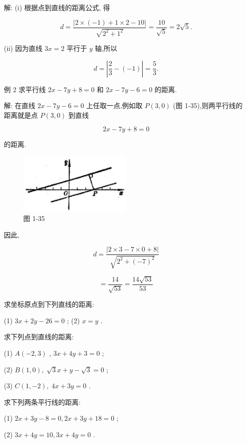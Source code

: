 \documentclass[lang=cn,newtx,10.5pt,scheme=chinese]{elegantbook}
\begin{document}
解: (i) 根据点到直线的距离公式, 得

\[
  d = \frac{\left| 2 \times \left( -1\right) + 1 \times 2 - {10}\right| }{\sqrt{{2}^{2} + {1}^{2}}} = \frac{10}{\sqrt{5}} = 2\sqrt{5}.
\]

(ii) 因为直线 \({3x} = 2\) 平行于 \(y\) 轴,所以

\[
  d = \left| {\frac{2}{3} - \left( {-1}\right) }\right| = \frac{5}{3}.
\]

例 2 求平行线 \({2x} - {7y} + 8 = 0\) 和 \({2x} - {7y} - 6 = 0\) 的距离.

解: 在直线 \({2x} - {7y} - 6 = 0\) 上任取一点,例如取 \(P\left( {3,0}\right)\) (图 1-35),则两平行线的距离就是点 \(P\left( {3,0}\right)\) 到直线

\[
    {2x} - {7y} + 8 = 0
\]

的距离.

\begin{figure}[h]
  \centering
  \includegraphics[max width=0.5\textwidth]{images/01912cc2-ffb6-728e-9ae7-b113ff05c64b_56_427717.jpg}
  \caption{图 1-35}
\end{figure}



因此,

\[
  d = \frac{\left| 2 \times 3 - 7 \times 0 + 8\right| }{\sqrt{{2}^{2} + {\left( -7\right) }^{2}}}
\]

\[
  = \frac{14}{\sqrt{53}} = \frac{{14}\sqrt{53}}{53}
\]

\begin{problemset}[练习]

\item 求坐标原点到下列直线的距离:

(1) \({3x} + {2y} - {26} = 0\) ; (2) \(x = y\) .

\item 求下列点到直线的距离:

(1) \(A\left( {-2,3}\right)\) , \({3x} + {4y} + 3 = 0\) ;

(2) \(B\left( {1,0}\right) ,\;\sqrt{3}x + y - \sqrt{3} = 0\) ;

(3) \(C\left( {1, - 2}\right) ,\;{4x} + {3y} = 0\) .

\item 求下列两条平行线的距离:

(1) \({2x} + {3y} - 8 = 0,{2x} + {3y} + {18} = 0\) ;

(2) \({3x} + {4y} = {10},{3x} + {4y} = 0\) .

\end{problemset}
\end{document}
